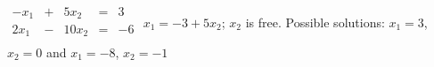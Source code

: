 {$\begin{array}{ccccc}
-x_1&+&5x_2&=&3\\
2x_1&-&10x_2&=&-6\\
\end{array}$}
{$x_1=-3+5x_2$; $x_2$ is free. Possible solutions: $x_1 = 3$, $x_2=0$ and $x_1 = -8$, $x_2 = -1$}